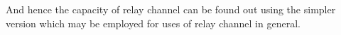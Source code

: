 \documentclass[preview]{standalone}
\begin{document}
\begin{center}
And hence the capacity of relay channel can be found out using the simpler version which may be employed for uses of relay channel in general.
\end{center}
\end{document}
